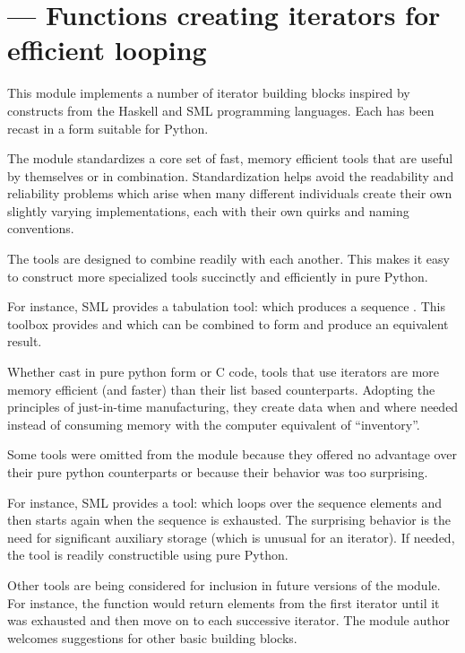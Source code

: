 \section{ ---
         Functions creating iterators for efficient looping}



This module implements a number of iterator building blocks inspired
by constructs from the Haskell and SML programming languages.  Each
has been recast in a form suitable for Python.

The module standardizes a core set of fast, memory efficient tools
that are useful by themselves or in combination.  Standardization helps
avoid the readability and reliability problems which arise when many
different individuals create their own slightly varying implementations,
each with their own quirks and naming conventions.

The tools are designed to combine readily with each another.  This makes
it easy to construct more specialized tools succinctly and efficiently
in pure Python.

For instance, SML provides a tabulation tool: 
which produces a sequence .  This toolbox
provides  and  which can be combined
to form  and produce an equivalent result.

Whether cast in pure python form or C code, tools that use iterators
are more memory efficient (and faster) than their list based counterparts.
Adopting the principles of just-in-time manufacturing, they create
data when and where needed instead of consuming memory with the
computer equivalent of ``inventory''.

Some tools were omitted from the module because they offered no
advantage over their pure python counterparts or because their behavior
was too surprising.

For instance, SML provides a tool:   which
loops over the sequence elements and then starts again when the
sequence is exhausted.  The surprising behavior is the need for
significant auxiliary storage (which is unusual for an iterator).
If needed, the tool is readily constructible using pure Python.

Other tools are being considered for inclusion in future versions of the
module.  For instance, the function
 would return elements from
the first iterator until it was exhausted and then move on to each
successive iterator.  The module author welcomes suggestions for other
basic building blocks.

